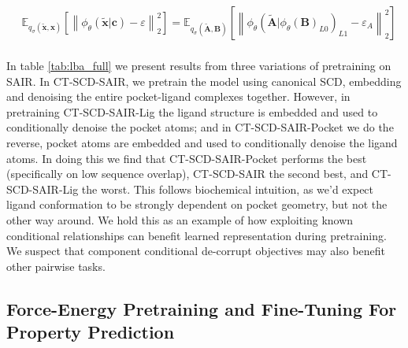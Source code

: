 \begin{equation}\label{component_conditional_denoising}
\begin{aligned}
&\mathbb{E}_{q_{\sigma}(\tilde{\mathbf{x}}, \mathbf{x})}
\left[
  \left\lVert
    \phi_{\theta}(\tilde{\mathbf{x}}|\mathbf{c}) - \varepsilon
  \right\rVert_{2}^{2}
\right]
= \mathbb{E}_{q_{\sigma}(\tilde{\mathbf{A}}, \mathbf{B})}
\left[
  \left\lVert
    \phi_{\theta}(\tilde{\mathbf{A}}|\phi_{\theta}(\mathbf{B})_{L0})_{L1} - \varepsilon_A
  \right\rVert_{2}^{2}
\right]\\
\end{aligned}
\end{equation}


In table \ref{tab:lba_full} we present results from three variations of pretraining on SAIR. In CT-SCD-SAIR, we pretrain the model using canonical SCD, embedding and denoising the entire pocket-ligand complexes together. However, in pretraining CT-SCD-SAIR-Lig the ligand structure is embedded and used to conditionally denoise the pocket atoms; and in CT-SCD-SAIR-Pocket we do the reverse, pocket atoms are embedded and used to conditionally denoise the ligand atoms. In doing this we find that CT-SCD-SAIR-Pocket performs the best (specifically on low sequence overlap), CT-SCD-SAIR the second best, and CT-SCD-SAIR-Lig the worst. This follows biochemical intuition, as we'd expect ligand conformation to be strongly dependent on pocket geometry, but not the other way around. We hold this as an example of how exploiting known conditional relationships can benefit learned representation during pretraining. We suspect that component conditional de-corrupt objectives may also benefit other pairwise tasks.




\subsection{Force-Energy Pretraining and Fine-Tuning For Property Prediction}

